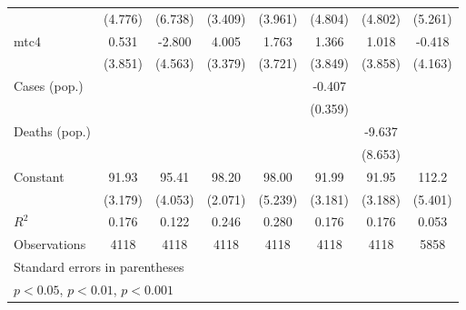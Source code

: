 \documentclass{article}
\begin{document}
{\begin{longtable}{l*{7}{c}}
                &  (4.776)         &  (6.738)         &  (3.409)         &  (3.961)         &  (4.804)         &  (4.802)         &  (5.261)         \\
mtc4            &    0.531         &   -2.800         &    4.005         &    1.763         &    1.366         &    1.018         &   -0.418         \\
                &  (3.851)         &  (4.563)         &  (3.379)         &  (3.721)         &  (3.849)         &  (3.858)         &  (4.163)         \\
Cases (pop.)    &                  &                  &                  &                  &   -0.407         &                  &                  \\
                &                  &                  &                  &                  &  (0.359)         &                  &                  \\
Deaths (pop.)   &                  &                  &                  &                  &                  &   -9.637         &                  \\
                &                  &                  &                  &                  &                  &  (8.653)         &                  \\
Constant        &    91.93\sym{***}&    95.41\sym{***}&    98.20\sym{***}&    98.00\sym{***}&    91.99\sym{***}&    91.95\sym{***}&    112.2\sym{***}\\
                &  (3.179)         &  (4.053)         &  (2.071)         &  (5.239)         &  (3.181)         &  (3.188)         &  (5.401)         \\
\hline
\(R^{2}\)       &    0.176         &    0.122         &    0.246         &    0.280         &    0.176         &    0.176         &    0.053         \\
Observations    &     4118         &     4118         &     4118         &     4118         &     4118         &     4118         &     5858         \\
\hline\hline
\multicolumn{8}{l}{\footnotesize Standard errors in parentheses}\\
\multicolumn{8}{l}{\footnotesize \sym{*} \(p<0.05\), \sym{**} \(p<0.01\), \sym{***} \(p<0.001\)}\\
\end{longtable}
}
\end{document}
